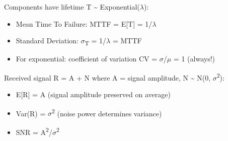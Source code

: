 Components have lifetime T \textasciitilde{} Exponential(\ensuremath{\lambda}):

\begin{itemize}
\tightlist
\item
  Mean Time To Failure: MTTF = E[T] = 1/\ensuremath{\lambda}
\item
  Standard Deviation: \ensuremath{\sigma}\textsubscript{T} = 1/\ensuremath{\lambda} = MTTF
\item
  For exponential: coefficient of variation CV = \ensuremath{\sigma}/\ensuremath{\mu} = 1 (always!)
\end{itemize}


Received signal R = A + N where A = signal amplitude, N \textasciitilde{} N(0, \ensuremath{\sigma}\textsuperscript{2}):

\begin{itemize}
\tightlist
\item
  E[R] = A (signal amplitude preserved on average)
\item
  Var(R) = \ensuremath{\sigma}\textsuperscript{2} (noise power determines variance)
\item
  SNR = A\textsuperscript{2}/\ensuremath{\sigma}\textsuperscript{2}
\end{itemize}


